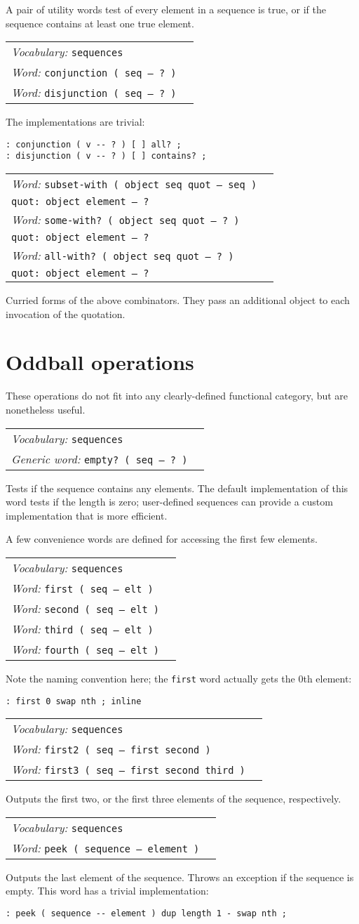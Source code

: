 \documentclass{book}
\newcommand{\vocabulary}[1]{\emph{Vocabulary:} \texttt{#1}&\\}
\newcommand{\ordinaryword}[2]{\index{\texttt{#1}}\emph{Word:} \texttt{#2}&\\}
\newcommand{\genericword}[2]{\index{\texttt{#1}}\emph{Generic word:} \texttt{#2}&\\}
\newcommand{\wordtable}[1]{


\begin{tabularx}{12cm}{lX}
\hline
#1
\hline
\end{tabularx}

}
\begin{document}
A pair of utility words test of every element in a sequence is true, or if the sequence contains at least one true element.
\wordtable{
\vocabulary{sequences}
\ordinaryword{conjunction}{conjunction~( seq -- ?~)}
\ordinaryword{disjunction}{disjunction~( seq -- ?~)}
}
The implementations are trivial:
\begin{verbatim}
: conjunction ( v -- ? ) [ ] all? ;
: disjunction ( v -- ? ) [ ] contains? ;
\end{verbatim}

\wordtable{
\ordinaryword{subset-with}{subset-with ( object seq quot -- seq )}
\texttt{quot:~object element -- ?}\\
\ordinaryword{some-with?}{some-with?~( object seq quot -- ?~)}
\texttt{quot:~object element -- ?}\\
\ordinaryword{all-with?}{all-with?~( object seq quot -- ?~)}
\texttt{quot:~object element -- ?}\\
}
Curried forms of the above combinators. They pass an additional object to each invocation of the quotation.

\section{Oddball operations}\label{oddball-seq}

These operations do not fit into any clearly-defined functional category, but are nonetheless useful.
\wordtable{
\vocabulary{sequences}
\genericword{empty?}{empty?~( seq -- ?~)}
}
Tests if the sequence contains any elements. The default implementation of this word tests if the length is zero; user-defined sequences can provide a custom implementation that is more efficient.

A few convenience words are defined for accessing the first few elements.
\wordtable{
\vocabulary{sequences}
\ordinaryword{first}{first ( seq -- elt )}
\ordinaryword{second}{second ( seq -- elt )}
\ordinaryword{third}{third ( seq -- elt )}
\ordinaryword{fourth}{fourth ( seq -- elt )}
}
Note the naming convention here; the \verb|first| word actually gets the 0th element:
\begin{verbatim}
: first 0 swap nth ; inline
\end{verbatim}
\wordtable{
\vocabulary{sequences}
\ordinaryword{first2}{first2 ( seq -- first second )}
\ordinaryword{first3}{first3 ( seq -- first second third )}
}
Outputs the first two, or the first three elements of the sequence, respectively.

\wordtable{
\vocabulary{sequences}
\ordinaryword{peek}{peek ( sequence -- element )}
}
Outputs the last element of the sequence. Throws an exception if the sequence is empty. This word has a trivial implementation:
\begin{verbatim}
: peek ( sequence -- element ) dup length 1 - swap nth ;
\end{verbatim}
\end{document}
